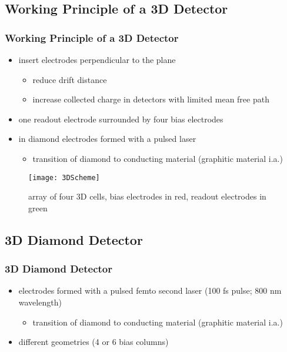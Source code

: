 \subsection{Working Principle of a 3D Detector}
\begin{frame}
	\frametitle{Working Principle of a 3D Detector}
	\begin{itemize}
		\setlength{\itemsep}{\fill}
		\item insert electrodes perpendicular to the plane
		\begin{itemize}
			\item reduce drift distance
			\item increase collected charge in detectors with limited mean free path %
		\end{itemize}
		\item one readout electrode surrounded by four bias electrodes
		\item in diamond electrodes formed with a pulsed laser
		\begin{itemize}
			\item transition of diamond to conducting material (graphitic material i.a.)
		\end{itemize}
	\end{itemize}
	\begin{figure}
		\centering
		\texttt{[image: 3DScheme]}
		\caption{array of four 3D cells, bias electrodes in red, readout electrodes in green}
	\end{figure}
\end{frame}

\subsection{3D Diamond Detector}
\begin{frame}
  \frametitle{3D Diamond Detector}
  \begin{itemize}
    \item electrodes formed with a pulsed femto second laser (100 fs pulse; 800 nm wavelength)
    \begin{itemize}
      \item transition of diamond to conducting material (graphitic material i.a.)
    \end{itemize}
    \item different geometries (4 or 6 bias columns)
  \end{itemize}

\end{frame}

